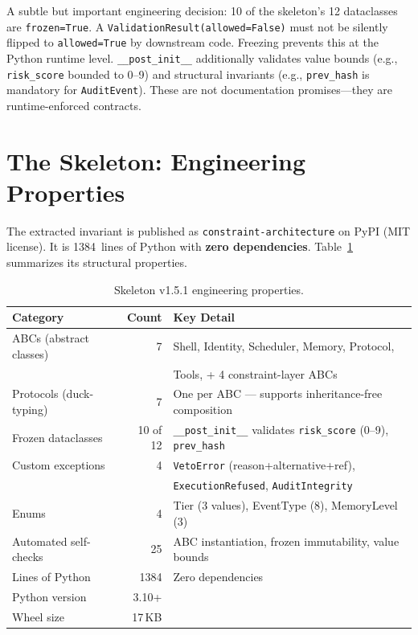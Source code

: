 \documentclass[letterpaper]{article}
\begin{document}
A subtle but important engineering decision: 10 of the skeleton's 12
dataclasses are \texttt{frozen=True}.  A \texttt{ValidationResult(allowed=False)}
must not be silently flipped to \texttt{allowed=True} by downstream code.
Freezing prevents this at the Python runtime level.  \texttt{\_\_post\_init\_\_}
additionally validates value bounds (e.g., \texttt{risk\_score} bounded to 0--9)
and structural invariants (e.g., \texttt{prev\_hash} is mandatory for
\texttt{AuditEvent}).  These are not documentation promises---they are
runtime-enforced contracts.

\section{The Skeleton: Engineering Properties}

The extracted invariant is published as \texttt{constraint-architecture} on
PyPI (MIT license).  It is 1384~lines of Python with \textbf{zero
dependencies}.  Table~\ref{tab:engineering} summarizes its structural
properties.

\begin{table}[h]
\centering
\caption{Skeleton v1.5.1 engineering properties.}
\label{tab:engineering}
\begin{tabular}{lrl}
\toprule
Category & Count & Key Detail \\
\midrule
ABCs (abstract classes) & 7 & Shell, Identity, Scheduler, Memory, Protocol, \\
   &    & \quad Tools, + 4 constraint-layer ABCs \\
Protocols (duck-typing) & 7 & One per ABC --- supports inheritance-free composition \\
Frozen dataclasses & 10 of 12 & \verb|__post_init__| validates \verb|risk_score| (0--9), \verb|prev_hash| \\
Custom exceptions & 4 & \verb|VetoError| (reason+alternative+ref), \\
   &    & \quad \verb|ExecutionRefused|, \verb|AuditIntegrity| \\
Enums & 4 & Tier (3 values), EventType (8), MemoryLevel (3) \\
Automated self-checks & 25 & ABC instantiation, frozen immutability, value bounds \\
\addlinespace
Lines of Python & 1384 & Zero dependencies \\
Python version & 3.10+ & \\
Wheel size & 17\,KB & \\
\bottomrule
\end{tabular}
\end{table}
\end{document}
